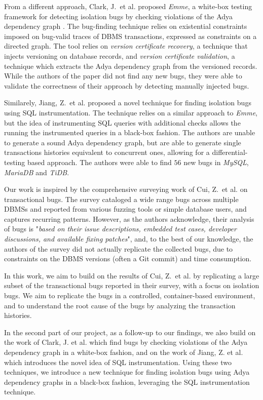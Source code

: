From a different approach, Clark, J.\ et al. \cite{clark2024validating} proposed \textit{Emme}, a white-box testing framework for detecting isolation bugs by checking violations of the Adya dependency graph \cite{adya1999weak}. The bug-finding technique relies on existential constraints imposed on bug-valid traces of DBMS transactions, expressed as constraints on a directed graph. The tool relies on \textit{version certificate recovery}, a technique that injects versioning on database records, and \textit{version certificate validation}, a technique which extracts the Adya dependency graph from the versioned records. While the authors of the paper did not find any new bugs, they were able to validate the correctness of their approach by detecting manually injected bugs.

Similarely, Jiang, Z.\ et al. \cite{jiang2023detecting} proposed a novel technique for finding isolation bugs using SQL instrumentation. The technique relies on a similar approach to \textit{Emme}, but the idea of instrumenting SQL queries with additional checks allows the running the instrumented queries in a black-box fashion. The authors are unable to generate a sound Adya dependency graph, but are able to generate single transactions histories equivalent to concurrent ones, allowing for a differential-testing based approach. The authors were able to find $56$ new bugs in \textit{MySQL}, \textit{MariaDB} and \textit{TiDB}.

Our work is inspired by the comprehensive surveying work of Cui, Z.\ et al. \cite{cui2024understanding_ICSE2024} on transactional bugs. The survey cataloged a wide range bugs across multiple DBMSs and reported from various fuzzing tools or simple database users, and captures recurring patterns. However, as the authors acknowledge, their analysis of bugs is "\textit{based on their issue descriptions, embedded test cases, developer discussions, and available fixing patches}", and, to the best of our knowledge, the authors of the survey did not actually replicate the collected bugs, due to constraints on the DBMS versions (often a Git commit) and time consumption.

In this work, we aim to build on the results of Cui, Z.\ et al. \cite{cui2024understanding_ICSE2024} by replicating a large subset of the transactional bugs reported in their survey, with a focus on isolation bugs. We aim to replicate the bugs in a controlled, container-based environment, and to understand the root cause of the bugs by analyzing the transaction histories.

In the second part of our project, as a follow-up to our findings, we also build on the work of Clark, J. et al. \cite{clark2024validating} which find bugs by checking violations of the Adya dependency graph \cite{adya1999weak} in a white-box fashion, and on the work of Jiang, Z. et al. \cite{jiang2023detecting} which introduces the novel idea of SQL instrumentation. Using these two techniques, we introduce a new technique for finding isolation bugs using Adya dependency graphs in a black-box fashion, leveraging the SQL instrumentation technique.
